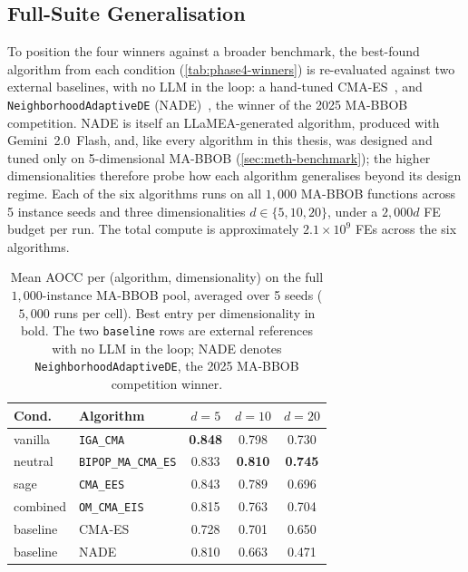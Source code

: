 \subsection{Full-Suite Generalisation}
\label{sec:results-stage4-generalisation}

To position the four winners against a broader benchmark, the best-found algorithm from each condition (\cref{tab:phase4-winners}) is re-evaluated against two external baselines, with no LLM in the loop: a hand-tuned CMA-ES~\cite{hansen2001cmaes}, and \texttt{NeighborhoodAdaptiveDE} (NADE)~\cite{vanStein2025NeighborhoodDE}, the winner of the 2025 MA-BBOB competition. NADE is itself an LLaMEA-generated algorithm, produced with Gemini~2.0~Flash, and, like every algorithm in this thesis, was designed and tuned only on 5-dimensional MA-BBOB (\cref{sec:meth-benchmark}); the higher dimensionalities therefore probe how each algorithm generalises beyond its design regime. Each of the six algorithms runs on all $1{,}000$ MA-BBOB functions across 5 instance seeds and three dimensionalities $d \in \{5, 10, 20\}$, under a $2{,}000d$ FE budget per run. The total compute is approximately $2.1 \times 10^9$ FEs across the six algorithms.

\begin{table}[t]
\centering
\caption{Mean AOCC per (algorithm, dimensionality) on the full $1{,}000$-instance MA-BBOB pool, averaged over 5 seeds ($5{,}000$ runs per cell). Best entry per dimensionality in bold. The two \texttt{baseline} rows are external references with no LLM in the loop; NADE denotes \texttt{NeighborhoodAdaptiveDE}, the 2025 MA-BBOB competition winner.}
\label{tab:phase4-fullsuite-summary}
\setlength{\tabcolsep}{6pt}
\begin{tabular}{@{}llccc@{}}
\toprule
\textbf{Cond.} & \textbf{Algorithm} & $d=5$ & $d=10$ & $d=20$ \\
\midrule
vanilla   & \texttt{IGA\_CMA}            & \textbf{0.848} & 0.798 & 0.730 \\
neutral   & \texttt{BIPOP\_MA\_CMA\_ES}   & 0.833 & \textbf{0.810} & \textbf{0.745} \\
sage      & \texttt{CMA\_EES}            & 0.843 & 0.789 & 0.696 \\
combined  & \texttt{OM\_CMA\_EIS}         & 0.815 & 0.763 & 0.704 \\
baseline  & CMA-ES~\cite{hansen2001cmaes} & 0.728 & 0.701 & 0.650 \\
baseline  & NADE~\cite{vanStein2025NeighborhoodDE} & 0.810 & 0.663 & 0.471 \\
\bottomrule
\end{tabular}
\end{table}

